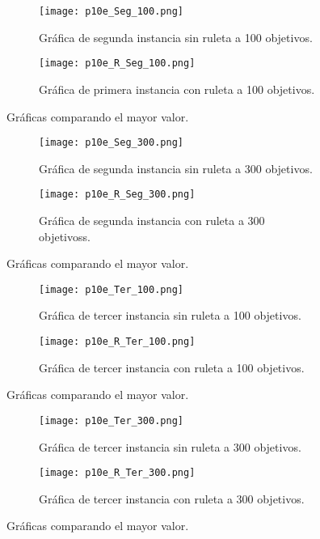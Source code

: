 \documentclass{article}
\begin{document}
\begin{figure}[H]
\centering
\begin{subfigure}[b]{0.40\linewidth}
\texttt{[image: p10e\_Seg\_100.png]}
\caption{Gráfica de segunda instancia sin ruleta a 100 objetivos.}
\end{subfigure}
\begin{subfigure}[b]{0.40\linewidth}
\texttt{[image: p10e\_R\_Seg\_100.png]}
\caption{Gráfica de primera instancia con ruleta a 100 objetivos.}
\end{subfigure}
\caption{Gráficas comparando el mayor valor.}
\label{fig:westminster}
\end{figure}

\begin{figure}[H]
\centering
\begin{subfigure}[b]{0.40\linewidth}
\texttt{[image: p10e\_Seg\_300.png]}
\caption{Gráfica de segunda instancia sin ruleta a 300 objetivos.}
\end{subfigure}
\begin{subfigure}[b]{0.40\linewidth}
\texttt{[image: p10e\_R\_Seg\_300.png]}
\caption{Gráfica de segunda instancia con ruleta a 300 objetivoss.}
\end{subfigure}
\caption{Gráficas comparando el mayor valor.}
\label{fig:westminster}
\end{figure}

\begin{figure}[H]
\centering
\begin{subfigure}[b]{0.40\linewidth}
\texttt{[image: p10e\_Ter\_100.png]}
\caption{Gráfica de tercer instancia sin ruleta a 100 objetivos.}
\end{subfigure}
\begin{subfigure}[b]{0.40\linewidth}
\texttt{[image: p10e\_R\_Ter\_100.png]}
\caption{Gráfica de tercer instancia con ruleta a 100 objetivos.}
\end{subfigure}
\caption{Gráficas comparando el mayor valor.}
\label{fig:westminster}
\end{figure}

\begin{figure}[H]
\centering
\begin{subfigure}[b]{0.40\linewidth}
\texttt{[image: p10e\_Ter\_300.png]}
\caption{Gráfica de tercer instancia sin ruleta a 300 objetivos.}
\end{subfigure}
\begin{subfigure}[b]{0.40\linewidth}
\texttt{[image: p10e\_R\_Ter\_300.png]}
\caption{Gráfica de tercer instancia con ruleta a 300 objetivos.}
\end{subfigure}
\caption{Gráficas comparando el mayor valor.}
\label{fig:westminster}
\end{figure}
\end{document}
